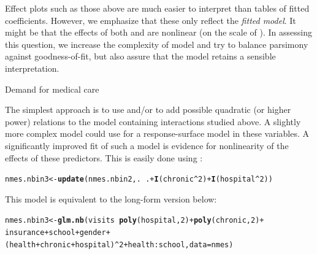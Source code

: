 \documentclass[11pt]{book}\usepackage[]{graphicx}\usepackage[]{color}
\makeatletter
\newcommand{\hlnum}[1]{\textcolor[rgb]{0.686,0.059,0.569}{#1}}%
\newcommand{\hlopt}[1]{\textcolor[rgb]{0,0,0}{#1}}%
\newcommand{\hlstd}[1]{\textcolor[rgb]{0.345,0.345,0.345}{#1}}%
\newcommand{\hlkwb}[1]{\textcolor[rgb]{0.69,0.353,0.396}{#1}}%
\newcommand{\hlkwc}[1]{\textcolor[rgb]{0.333,0.667,0.333}{#1}}%
\newcommand{\hlkwd}[1]{\textcolor[rgb]{0.737,0.353,0.396}{\textbf{#1}}}%
\newenvironment{kframe}{%
 \def\at@end@of@kframe{}%
 \ifinner\ifhmode%
  \def\at@end@of@kframe{\end{minipage}}%
  \begin{minipage}{\columnwidth}%
 \fi\fi%
 \def\FrameCommand##1{\hskip\@totalleftmargin \hskip-\fboxsep
 \colorbox{shadecolor}{##1}\hskip-\fboxsep
     \hskip-\linewidth \hskip-\@totalleftmargin \hskip\columnwidth}%
 \MakeFramed {\advance\hsize-\width
   \@totalleftmargin\z@ \linewidth\hsize
   \@setminipage}}%
 {\par\unskip\endMakeFramed%
 \at@end@of@kframe}
\newenvironment{knitrout}{}{} %
\renewenvironment{knitrout}{\small\renewcommand{\baselinestretch}{.85}}{} %
\makeatother
\begin{document}
Effect plots such as those above are much easier to interpret than
tables of fitted coefficients. However, we emphasize that these only
reflect the \emph{fitted model}. It might be that the effects of both
 and  are nonlinear (on the scale of
).
In assessing this question, we increase the complexity of model
and try to balance parsimony against goodness-of-fit, but also assure
that the model retains a sensible interpretation.

\begin{Example}[nmes3]{Demand for medical care}

The simplest approach is to use
 and/or  to add
possible quadratic (or higher power) relations to the model 
containing interactions studied above.
A slightly more
complex model could use 
for a response-surface model in these variables.
A significantly improved fit of such a model is evidence for nonlinearity of the effects
of these predictors.  This is easily done using :
\begin{knitrout}
\color{fgcolor}\begin{kframe}
\begin{alltt}
\hlstd{nmes.nbin3} \hlkwb{<-} \hlkwd{update}\hlstd{(nmes.nbin2, .} \hlopt{~} \hlstd{.} \hlopt{+} \hlkwd{I}\hlstd{(chronic}\hlopt{^}\hlnum{2}\hlstd{)} \hlopt{+} \hlkwd{I}\hlstd{(hospital}\hlopt{^}\hlnum{2}\hlstd{))}
\end{alltt}
\end{kframe}
\end{knitrout}
\noindent This model is equivalent to the long-form version below:
\begin{knitrout}
\color{fgcolor}\begin{kframe}
\begin{alltt}
\hlstd{nmes.nbin3} \hlkwb{<-} \hlkwd{glm.nb}\hlstd{(visits} \hlopt{~} \hlkwd{poly}\hlstd{(hospital,}\hlnum{2}\hlstd{)} \hlopt{+} \hlkwd{poly}\hlstd{(chronic,}\hlnum{2}\hlstd{)} \hlopt{+}
                     \hlstd{insurance} \hlopt{+} \hlstd{school} \hlopt{+} \hlstd{gender} \hlopt{+}
                     \hlstd{(health}\hlopt{+}\hlstd{chronic}\hlopt{+}\hlstd{hospital)}\hlopt{^}\hlnum{2} \hlopt{+} \hlstd{health}\hlopt{:}\hlstd{school,} \hlkwc{data} \hlstd{= nmes)}
\end{alltt}
\end{kframe}

\end{knitrout}
\end{Example}
\end{document}
